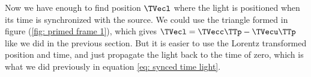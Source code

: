 \begin{derivation}

	Now we have enough to find position $\TVecl $ where the light is positioned when its time is synchronized with the source.
	We could use the triangle formed in figure (\ref{fig: primed frame 1}), which gives $\TVecl  = \TVecc  \TTp  -\TVecu  \TTp $ like we did in the previous section.
	But it is easier to use the Lorentz transformed position and time, and just propagate the light back to the time of zero, which is what we did previously in equation \eqref{eq: synced time light}.


\end{derivation}
